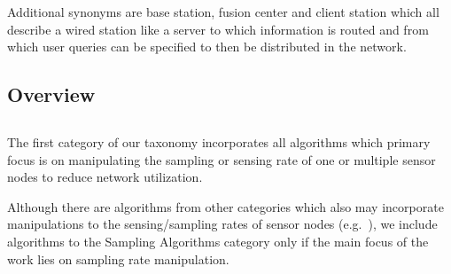 Additional synonyms are base station,
fusion center and client station which all describe a wired station like a
server to which information is routed and from which user queries can be
specified to then be distributed in the network.

\subsection{Overview}
\label{sec:Overview}


\subsection{\catI} %
\label{sec:catI}

The first category of our taxonomy incorporates all algorithms which primary 
focus is on manipulating the sampling or sensing rate of one or multiple sensor
nodes to reduce network utilization.
 
Although there are algorithms from other categories which also may incorporate
manipulations to the sensing/sampling rates of sensor nodes
(e.g.~\cite{trihinas2015adam}), we include algorithms to the Sampling Algorithms
category only if the main focus of the work lies on sampling rate manipulation. %

